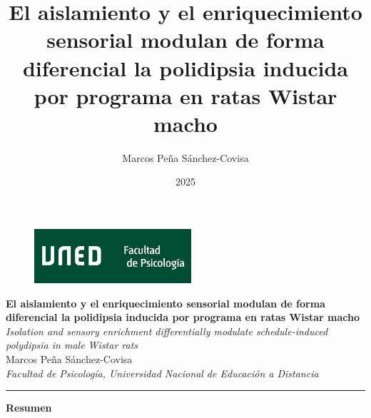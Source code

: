 \documentclass[12pt,a4paper]{article}
\title{El aislamiento y el enriquecimiento sensorial modulan de forma diferencial la polidipsia inducida por programa en ratas Wistar macho}
\author{Marcos Peña Sánchez-Covisa}
\date{2025}
\begin{document}
\begin{figure}[H]
    \raggedleft
    \includegraphics[scale=0.4]{LogoUNED.jpg}
\end{figure}

\begin{center}
    {\Large \textbf{El aislamiento y el enriquecimiento sensorial modulan de forma diferencial la polidipsia inducida por programa en ratas Wistar macho}} \\
    \vspace{1mm}
    {\normalsize \textit{Isolation and sensory enrichment differentially modulate schedule-induced polydipsia in male Wistar rats}} \\
    \vspace{5mm}
    {\large Marcos Peña Sánchez-Covisa} \\
    \vspace{3mm}
    \textit{Facultad de Psicología, Universidad Nacional de Educación a Distancia}
\end{center}

\begin{center}
    \textcolor{azul}{\rule{150mm}{0.5mm}}
    \end{center}
    
    \begin{center}
    \textbf{\large Resumen}
    \end{center}
    
\end{document}
